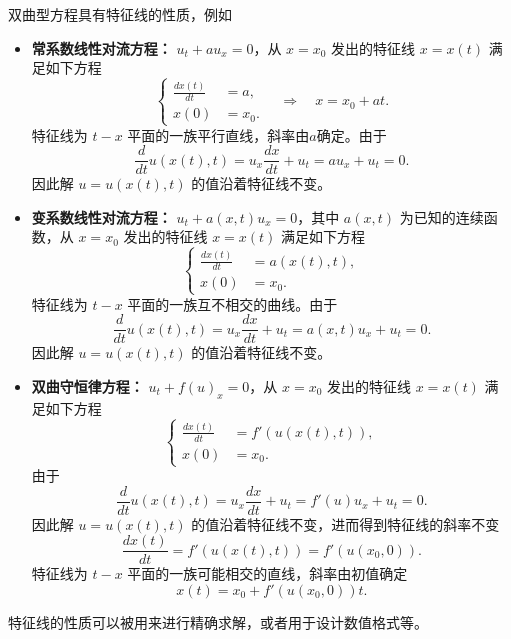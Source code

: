 双曲型方程具有特征线的性质，例如
\begin{itemize}
    \item \textbf{常系数线性对流方程：} $u_t + a u_x = 0$，从 $x=x_0$ 发出的特征线 $x=x(t)$ 满足如下方程
          \[
              \left\{
              \begin{aligned}
                  \frac{d x(t)}{d t} & = a,   \\
                  x(0)               & = x_0.
              \end{aligned}
              \right. \quad \Rightarrow \quad x = x_0 + a t.
          \]
          特征线为 $t\!-\!x$ 平面的一族平行直线，斜率由$a$确定。由于
          \[
              \frac{d}{d t}u(x(t),t) = u_x \frac{d x}{d t} + u_t = a u_x + u_t = 0.
          \]
          因此解 $u = u(x(t),t)$ 的值沿着特征线不变。
    \item \textbf{变系数线性对流方程：} $u_t + a(x,t) u_x = 0$，其中 $a(x,t)$ 为已知的连续函数，从 $x=x_0$ 发出的特征线 $x=x(t)$ 满足如下方程
          \[
              \left\{
              \begin{aligned}
                  \frac{d x(t)}{d t} & = a(x(t),t), \\
                  x(0)               & = x_0.
              \end{aligned}
              \right.
          \]
          特征线为 $t\!-\!x$ 平面的一族互不相交的曲线。由于
          \[
              \frac{d}{d t}u(x(t),t) = u_x \frac{d x}{d t} + u_t = a(x,t) u_x + u_t = 0.
          \]
          因此解 $u = u(x(t),t)$ 的值沿着特征线不变。
    \item \textbf{双曲守恒律方程：} $u_t + f(u)_x = 0$，从 $x=x_0$ 发出的特征线 $x=x(t)$ 满足如下方程
          \[
              \left\{
              \begin{aligned}
                  \frac{d x(t)}{d t} & = f'(u(x(t),t)), \\
                  x(0)               & = x_0.
              \end{aligned}
              \right.
          \]
          由于
          \[
              \frac{d}{d t}u(x(t),t) = u_x \frac{d x}{d t} + u_t = f'(u) u_x + u_t = 0.
          \]
          因此解 $u = u(x(t),t)$ 的值沿着特征线不变，进而得到特征线的斜率不变
          \[
              \frac{d x(t)}{d t} = f'(u(x(t),t)) = f'(u(x_0,0)).
          \]
          特征线为 $t\!-\!x$ 平面的一族可能相交的直线，斜率由初值确定
          \[
              x(t) = x_0 + f'(u(x_0,0)) t.
          \]
\end{itemize}
特征线的性质可以被用来进行精确求解，或者用于设计数值格式等。


